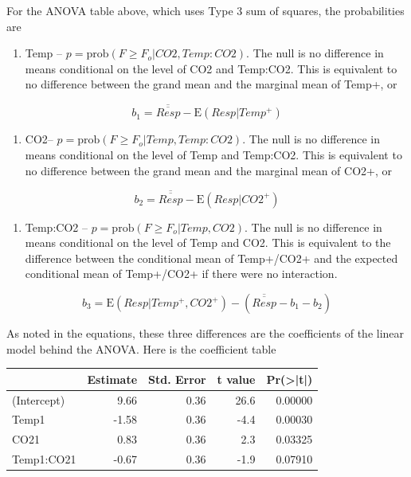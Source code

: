 \documentclass[]{book}
\providecommand{\tightlist}{%
  \setlength{\itemsep}{0pt}\setlength{\parskip}{0pt}}
\begin{document}
For the ANOVA table above, which uses Type 3 sum of squares, the
probabilities are

\begin{enumerate}
\def\labelenumi{\arabic{enumi}.}
\tightlist
\item
  Temp -- \(p = \mathrm{prob}(F \ge F_o|CO2, Temp:CO2)\). The null is no
  difference in means conditional on the level of CO2 and Temp:CO2. This
  is equivalent to no difference between the grand mean and the marginal
  mean of Temp+, or
\end{enumerate}

\begin{equation}
b_1 = \overline{\overline{Resp}} - \mathrm{E}(Resp|Temp^+)
\end{equation}

\begin{enumerate}
\def\labelenumi{\arabic{enumi}.}
\setcounter{enumi}{1}
\tightlist
\item
  CO2-- \(p = \mathrm{prob}(F \ge F_o|Temp, Temp:CO2)\). The null is no
  difference in means conditional on the level of Temp and Temp:CO2.
  This is equivalent to no difference between the grand mean and the
  marginal mean of CO2+, or
\end{enumerate}

\begin{equation}
b_2 = \overline{\overline{Resp}} - \mathrm{E}(Resp|CO2^+)
\end{equation}

\begin{enumerate}
\def\labelenumi{\arabic{enumi}.}
\setcounter{enumi}{2}
\tightlist
\item
  Temp:CO2 -- \(p = \mathrm{prob}(F \ge F_o|Temp, CO2)\). The null is no
  difference in means conditional on the level of Temp and CO2. This is
  equivalent to the difference between the conditional mean of
  Temp+/CO2+ and the expected conditional mean of Temp+/CO2+ if there
  were no interaction.
\end{enumerate}

\begin{equation}
b_3 = \mathrm{E}(Resp|Temp^+, CO2^+) - (\overline{\overline{Resp}} - b_1 - b_2)
\end{equation}

As noted in the equations, these three differences are the coefficients
of the linear model behind the ANOVA. Here is the coefficient table

\begin{tabular}{l|r|r|r|r}
\hline
  & Estimate & Std. Error & t value & Pr(>|t|)\\
\hline
(Intercept) & 9.66 & 0.36 & 26.6 & 0.00000\\
\hline
Temp1 & -1.58 & 0.36 & -4.4 & 0.00030\\
\hline
CO21 & 0.83 & 0.36 & 2.3 & 0.03325\\
\hline
Temp1:CO21 & -0.67 & 0.36 & -1.9 & 0.07910\\
\hline
\end{tabular}
\end{document}
